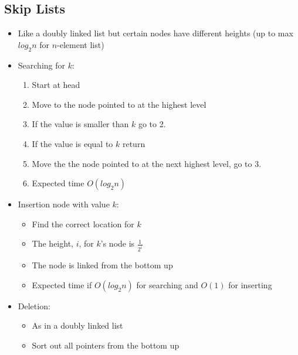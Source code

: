 \documentclass[a4paper]{article}
\begin{document}
\subsection{Skip Lists}
\begin{itemize}
		\item Like a doubly linked list but certain nodes have different heights (up to max $log_2 n$ for $n$-element list)
		\item Searching for $k$:
				\begin{enumerate}
						\item Start at head
						\item Move to the node pointed to at the highest level
						\item If the value is smaller than $k$ go to 2.
						\item If the value is equal to $k$ return
						\item Move the the node pointed to at the next highest level, go to 3.
						\item Expected time $O(log_2 n)$
				\end{enumerate}
		\item Insertion node with value $k$:
				\begin{itemize}
						\item Find the correct location for $k$
						\item The height, $i$, for $k$'s node is $\frac{1}{2^i}$
						\item The node is linked from the bottom up
						\item Expected time if $O(log_2 n)$ for searching and $O(1)$ for inserting
				\end{itemize}
		\item Deletion:
				\begin{itemize}
						\item As in a doubly linked list
						\item Sort out all pointers from the bottom up
				\end{itemize}
\end{itemize}
\end{document}
